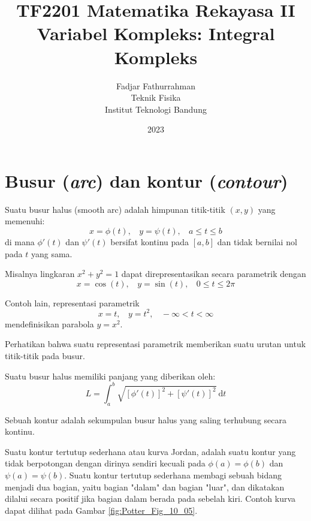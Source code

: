 



\title{%
{\small TF2201 Matematika Rekayasa II}\\
Variabel Kompleks: Integral Kompleks
}
\author{Fadjar Fathurrahman\\
Teknik Fisika\\
Institut Teknologi Bandung}
\date{2023}
\maketitle


\section{Busur (\textit{arc}) dan kontur (\textit{contour})}

Suatu busur halus (smooth arc) adalah himpunan titik-titik $(x,y)$
yang memenuhi:
\begin{equation*}
x=\phi(t),\ \ \ \ y=\psi(t),\ \ \ \ a\leq t\leq b
\end{equation*}
di mana $\phi'(t)$ dan $\psi'(t)$ bersifat kontinu pada $[a,b]$
dan tidak bernilai nol pada $t$ yang sama.

Misalnya lingkaran $x^{2} + y^{2} = 1$ dapat direpresentasikan secara
parametrik dengan
\begin{equation*}
x=\cos(t),\ \ \ \ y=\sin(t),\ \ \ \ 0 \leq t \leq 2\pi
\end{equation*}

Contoh lain, representasi parametrik
\begin{equation*}
x=t,\ \ \ \ y=t^{2},\ \ \ \ -\infty<t<\infty    
\end{equation*}
mendefinisikan parabola $y=x^{2}$.

Perhatikan bahwa suatu representasi parametrik memberikan suatu urutan
untuk titik-titik pada busur.

Suatu busur halus memiliki panjang yang diberikan oleh:
\begin{equation*}
L = \int_{a}^{b} \sqrt{\left[\phi'(t)\right]^{2}+\left[\psi'(t)\right]^{2}}\ \mathrm{d}t    
\end{equation*}

Sebuah kontur adalah sekumpulan busur halus yang saling terhubung
secara kontinu.

Suatu kontur tertutup sederhana atau kurva Jordan, adalah suatu kontur
yang tidak berpotongan dengan dirinya sendiri kecuali pada $\phi(a)=\phi(b)$
dan $\psi(a)=\psi(b)$. Suatu kontur tertutup sederhana membagi sebuah
bidang menjadi dua bagian, yaitu bagian "dalam" dan bagian "luar",
dan dikatakan dilalui secara positif jika bagian dalam berada pada
sebelah kiri. Contoh kurva dapat dilihat pada Gambar
\ref{fig:Potter_Fig_10_05}.

